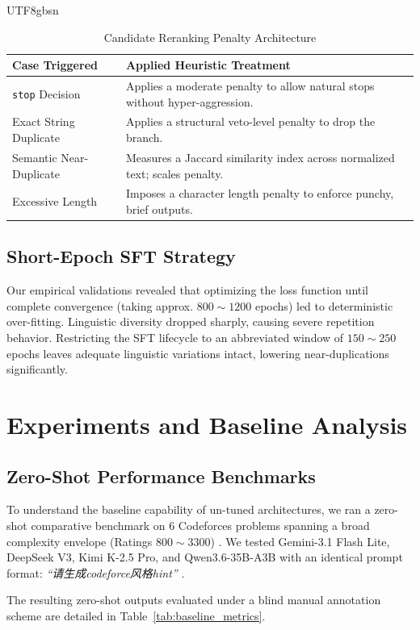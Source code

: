 \documentclass{article}
\begin{document}
\begin{CJK*}{UTF8}{gbsn}
\begin{table}[h]
  \caption{Candidate Reranking Penalty Architecture}
  \label{tab:rerank_logic}
  \centering
  \begin{tabular}{ll}
    \toprule
    Case Triggered & Applied Heuristic Treatment \\
    \midrule
    \texttt{stop} Decision & Applies a moderate penalty to allow natural stops without hyper-aggression. \\
    Exact String Duplicate & Applies a structural veto-level penalty to drop the branch. \\
    Semantic Near-Duplicate & Measures a Jaccard similarity index across normalized text; scales penalty. \\
    Excessive Length & Imposes a character length penalty to enforce punchy, brief outputs. \\
    \bottomrule
  \end{tabular}
\end{table}

\subsection{Short-Epoch SFT Strategy}
Our empirical validations revealed that optimizing the loss function until complete convergence (taking approx. $800 \sim 1200$ epochs) led to deterministic over-fitting. Linguistic diversity dropped sharply, causing severe repetition behavior. Restricting the SFT lifecycle to an abbreviated window of $150 \sim 250$ epochs leaves adequate linguistic variations intact, lowering near-duplications significantly.

\section{Experiments and Baseline Analysis}

\subsection{Zero-Shot Performance Benchmarks}
To understand the baseline capability of un-tuned architectures, we ran a zero-shot comparative benchmark on 6 Codeforces problems spanning a broad complexity envelope (Ratings $800 \sim 3300$) \cite{codeforces2023}. We tested Gemini-3.1 Flash Lite, DeepSeek V3, Kimi K-2.5 Pro, and Qwen3.6-35B-A3B with an identical prompt format: \textit{``请生成codeforce风格hint''} \cite{codeforces2023}.

The resulting zero-shot outputs evaluated under a blind manual annotation scheme are detailed in Table~\ref{tab:baseline_metrics}.


\end{CJK*}
\end{document}
